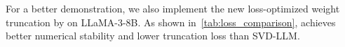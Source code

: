 For a better demonstration, we also implement the new loss-optimized weight truncation by \sysname on LLaMA-3-8B. As shown in~\cref{tab:loss_comparison}, \sysname achieves better numerical stability and lower truncation loss than SVD-LLM.








